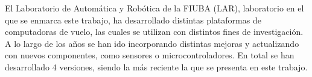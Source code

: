 
El Laboratorio de Automática y Robótica de la FIUBA (LAR), laboratorio en el que se enmarca este trabajo, ha desarrollado distintas plataformas de computadoras de vuelo, las cuales se utilizan con distintos fines de investigación. A lo largo de los años se han ido incorporando distintas mejoras y actualizando con nuevos componentes, como sensores o microcontroladores. En total se han desarrollado 4 versiones, siendo la más reciente la que se presenta en este trabajo.



